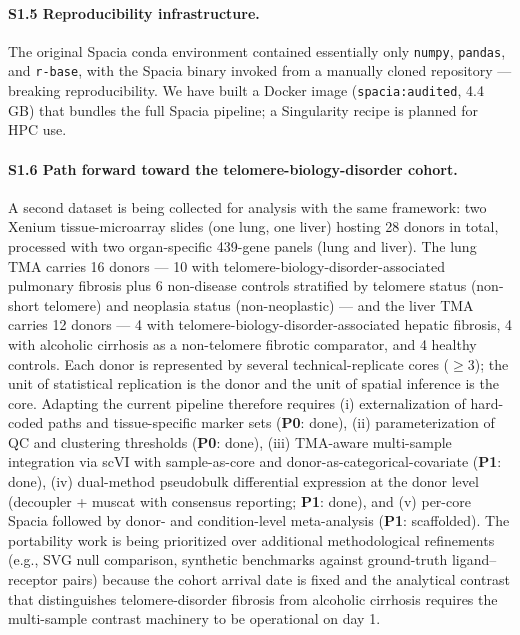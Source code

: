 \documentclass[12pt,a4paper]{article}
\begin{document}
\paragraph{S1.5 Reproducibility infrastructure.}
The original Spacia conda environment contained essentially only \texttt{numpy}, \texttt{pandas}, and \texttt{r-base}, with the Spacia binary invoked from a manually cloned repository --- breaking reproducibility. We have built a Docker image (\texttt{spacia:audited}, 4.4 GB) that bundles the full Spacia pipeline; a Singularity recipe is planned for HPC use.

\paragraph{S1.6 Path forward toward the telomere-biology-disorder cohort.}
A second dataset is being collected for analysis with the same framework: two Xenium tissue-microarray slides (one lung, one liver) hosting 28 donors in total, processed with two organ-specific 439-gene panels (lung and liver). The lung TMA carries 16 donors --- 10 with telomere-biology-disorder-associated pulmonary fibrosis plus 6 non-disease controls stratified by telomere status (non-short telomere) and neoplasia status (non-neoplastic) --- and the liver TMA carries 12 donors --- 4 with telomere-biology-disorder-associated hepatic fibrosis, 4 with alcoholic cirrhosis as a non-telomere fibrotic comparator, and 4 healthy controls. Each donor is represented by several technical-replicate cores ($\geq 3$); the unit of statistical replication is the donor and the unit of spatial inference is the core. Adapting the current pipeline therefore requires (i) externalization of hard-coded paths and tissue-specific marker sets (\textbf{P0}: done), (ii) parameterization of QC and clustering thresholds (\textbf{P0}: done), (iii) TMA-aware multi-sample integration via scVI with sample-as-core and donor-as-categorical-covariate (\textbf{P1}: done), (iv) dual-method pseudobulk differential expression at the donor level (decoupler + muscat with consensus reporting; \textbf{P1}: done), and (v) per-core Spacia followed by donor- and condition-level meta-analysis (\textbf{P1}: scaffolded). The portability work is being prioritized over additional methodological refinements (e.g., SVG null comparison, synthetic benchmarks against ground-truth ligand--receptor pairs) because the cohort arrival date is fixed and the analytical contrast that distinguishes telomere-disorder fibrosis from alcoholic cirrhosis requires the multi-sample contrast machinery to be operational on day 1.
\end{document}
